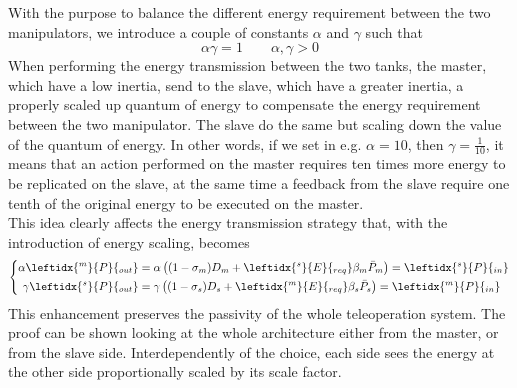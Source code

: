 With the purpose to balance the different energy requirement between the two manipulators, we introduce a couple of constants $\alpha$ and $\gamma$ such that
\begin{equation}\label{Scaling_condition}
	\alpha \gamma = 1 \qquad \alpha,\gamma >0
\end{equation}
When performing the energy transmission between the two tanks, the master, which have a low inertia, send to the slave, which have a greater inertia, a properly scaled up quantum of energy to compensate the energy requirement between the two manipulator. The slave do the same but scaling down the value of the quantum of energy.
In other words, if we set in e.g. $\alpha = 10$, then $\gamma = \frac{1}{10}$, it means that an action performed on the master requires ten times more energy to be replicated on the slave, at the same time a feedback from the slave require one tenth of the original energy to be executed on the master.\\
This idea clearly affects the energy transmission strategy that, with the introduction of energy scaling, becomes
\begin{equation}\label{Transmission_strategy_scaled}
	\left\lbrace 
	\begin{aligned}
		\alpha \leftidx{^m}{P}{_{out}} &= \alpha \left( (1- \sigma_{m})D_{m} + 	\leftidx{^s}{E}{_{req}} \beta_{m}\bar{P}_{m} \right) = \leftidx{^s}{P}{_{in}} \\
	\gamma	\leftidx{^s}{P}{_{out}} &= \gamma \left( (1- \sigma_{s})D_{s} + 	\leftidx{^m}{E}{_{req}} \beta_{s}\bar{P}_{s}\right)  = \leftidx{^m}{P}{_{in}}
	\end{aligned}
	\right.
\end{equation}
This enhancement preserves the passivity of the whole teleoperation system.
The proof can be shown looking at the whole architecture either from the master, or from the slave side.
Interdependently of the choice, each side sees the energy at the other side proportionally scaled by its scale factor.
